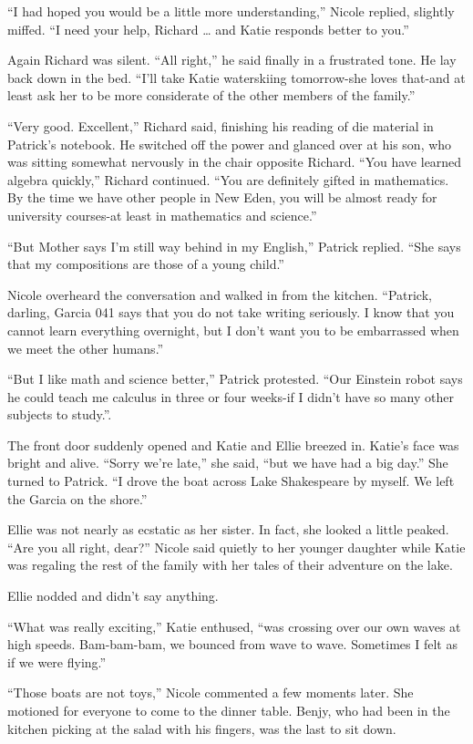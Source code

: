 \documentclass[]{article}
\begin{document}
{“I had hoped you would be a little more understanding,” Nicole replied, slightly miffed. “I need your help, Richard … and Katie responds better to you.”

Again Richard was silent. “All right,” he said finally in a frustrated tone. He lay back down in the bed. “I’ll take Katie waterskiing tomorrow-she loves that-and at least ask her to be more considerate of the other members of the family.”

“Very good. Excellent,” Richard said, finishing his reading of die material in Patrick’s notebook. He switched off the power and glanced over at his son, who was sitting somewhat nervously in the chair opposite Richard. “You have learned algebra quickly,” Richard continued. “You are definitely gifted in mathematics. By the time we have other people in New Eden, you will be almost ready for university courses-at least in mathematics and science.”

“But Mother says I’m still way behind in my English,” Patrick replied. “She says that my compositions are those of a young child.”

Nicole overheard the conversation and walked in from the kitchen. “Patrick, darling, Garcia 041 says that you do not take writing seriously. I know that you cannot learn everything overnight, but I don’t want you to be embarrassed when we meet the other humans.”

“But I like math and science better,” Patrick protested. “Our Einstein robot says he could teach me calculus in three or four weeks-if I didn’t have so many other subjects to study.”.

The front door suddenly opened and Katie and Ellie breezed in. Katie’s face was bright and alive. “Sorry we’re late,” she said, “but we have had a big day.” She turned to Patrick. “I drove the boat across Lake Shakespeare by myself. We left the Garcia on the shore.”

Ellie was not nearly as ecstatic as her sister. In fact, she looked a little peaked. “Are you all right, dear?” Nicole said quietly to her younger daughter while Katie was regaling the rest of the family with her tales of their adventure on the lake.

Ellie nodded and didn’t say anything.

“What was really exciting,” Katie enthused, “was crossing over our own waves at high speeds. Bam-bam-bam, we bounced from wave to wave. Sometimes I felt as if we were flying.”

“Those boats are not toys,” Nicole commented a few moments later. She motioned for everyone to come to the dinner table. Benjy, who had been in the kitchen picking at the salad with his fingers, was the last to sit down.

}
\end{document}

